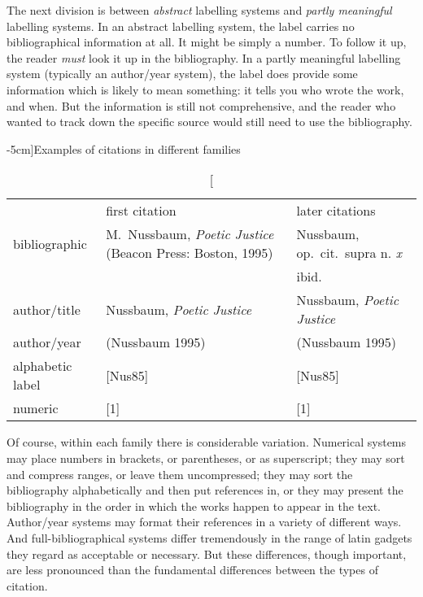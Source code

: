 The next division is between \emph{abstract} labelling systems and
\emph{partly meaningful} labelling systems. In an abstract labelling
system, the label carries no bibliographical information at all.
It might be simply a number.
To follow it up, the reader
\emph{must} look it up in the bibliography. In a partly meaningful
labelling system (typically an author/year system), the label does
provide some information which is likely to mean something:
it tells you who wrote the work, and when. But the information is
still not comprehensive, and the reader who wanted to track down the
specific source would still need to use the bibliography.

\begin{table*}[tbh]
\caption[][-5cm]{Examples of citations in different families}
\begin{tabular}{lp{6cm}p{6cm}}
\toprule
& \textsf{first citation} & \textsf{later citations} \\
\cmidrule(lr){2-2}\cmidrule(lr){3-3}
\textsf{bibliographic} & M.\ Nussbaum, \emph{Poetic Justice} (Beacon
Press: Boston, 1995) & Nussbaum, op.\ cit.\ supra n. \emph{x}\\
& & ibid. \\
\textsf{author/title} & Nussbaum, \emph{Poetic Justice} & Nussbaum,
\emph{Poetic Justice}\\
\textsf{author/year} & (Nussbaum 1995) & (Nussbaum 1995) \\
\textsf{alphabetic label} & [Nus85] & [Nus85]\\
\textsf{numeric} & [1] & [1] \\
\bottomrule
\end{tabular}
\end{table*}

Of course, within each family there is considerable
variation. Numerical systems may place numbers in brackets, or parentheses, or
as superscript; they may sort and compress ranges, or leave them
uncompressed; they may sort the bibliography alphabetically and then
put references in, or they may present the bibliography in the order
in which the works happen to appear in the text. Author/year systems may format
their references in a variety of different ways. And
full-bibliographical systems differ tremendously in the range of latin
gadgets they regard as acceptable or necessary. But these differences,
though important, are less pronounced than the fundamental differences
between the types of citation.  

